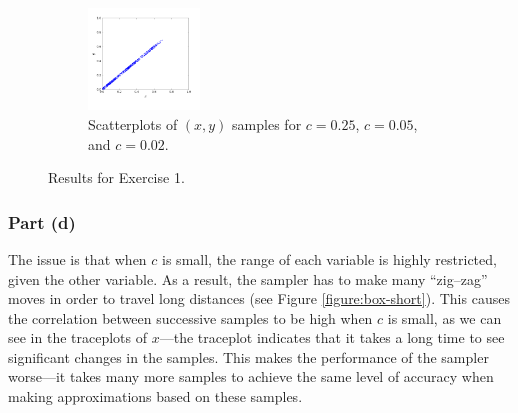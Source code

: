 \documentclass[12pt]{article}
\begin{document}
\begin{figure}
\begin{subfigure}[t]{1\textwidth}
            \includegraphics[trim=0.8cm 0.4cm 0.8cm 0, clip, width=0.325\textwidth]{code/box-scatter-c=0.02.png}
        \caption{Scatterplots of $(x,y)$ samples for $c = 0.25$, $c = 0.05$, and $c = 0.02$.}
    \end{subfigure}
    \vspace{.5em}
    \caption{Results for Exercise 1.}
    \label{figure:box}
\end{figure}

\subsubsection*{Part (d)}
The issue is that when $c$ is small, the range of each variable is highly restricted, given the other variable. As a result, the sampler has
to make many ``zig--zag'' moves in order to travel long distances (see Figure \ref{figure:box-short}). 
This causes the correlation between successive samples to be high when $c$ is small, as we can see in the traceplots of $x$---the traceplot
indicates that it takes a long time to see significant changes in the samples. This makes the performance of the sampler worse---it
takes many more samples to achieve the same level of accuracy when making approximations based on these samples.
\end{document}
